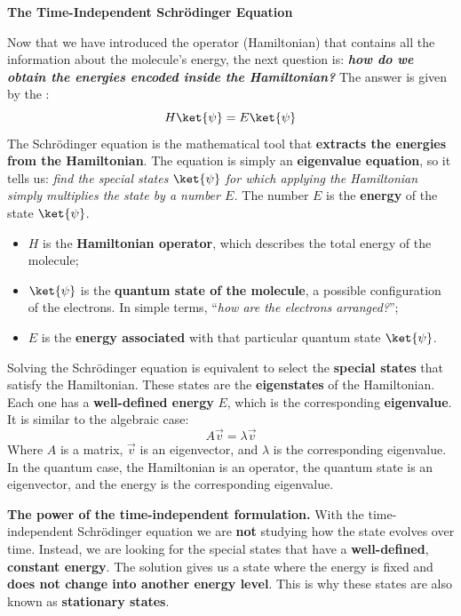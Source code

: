 \highspace
\begin{flushleft}
    \textcolor{Green3}{ \textbf{The Time-Independent Schrödinger Equation}}
\end{flushleft}
Now that we have introduced the operator (Hamiltonian) that contains all the information about the molecule's energy, the next question is: \emph{\textbf{how do we obtain the energies encoded inside the Hamiltonian?}} The answer is given by the :
\begin{equation}\label{eq:time-independent-schrodinger-equation}
    H \ket{\psi} = E \ket{\psi}
\end{equation}
The Schrödinger equation is the mathematical tool that \textbf{extracts the energies from the Hamiltonian}. The equation is simply an \textbf{eigenvalue equation}, so it tells us: \emph{find the special states $\ket{\psi}$ for which applying the Hamiltonian simply multiplies the state by a number $E$.} The number $E$ is the \textbf{energy} of the state $\ket{\psi}$.
\begin{itemize}
    \item $H$ is the \textbf{Hamiltonian operator}, which describes the total energy of the molecule;
    \item $\ket{\psi}$ is the \textbf{quantum state of the molecule}, a possible configuration of the electrons. In simple terms, ``\emph{how are the electrons arranged?}'';
    \item $E$ is the \textbf{energy associated} with that particular quantum state $\ket{\psi}$.
\end{itemize}
Solving the Schrödinger equation is equivalent to select the \textbf{special states} that satisfy the Hamiltonian. These states are the \textbf{eigenstates} of the Hamiltonian. Each one has a \textbf{well-defined energy} $E$, which is the corresponding \textbf{eigenvalue}. It is similar to the algebraic case:
\begin{equation*}
    A \vec{v} = \lambda \vec{v}
\end{equation*}
Where $A$ is a matrix, $\vec{v}$ is an eigenvector, and $\lambda$ is the corresponding eigenvalue. In the quantum case, the Hamiltonian is an operator, the quantum state is an eigenvector, and the energy is the corresponding eigenvalue.

\highspace
\textcolor{Green3}{ \textbf{The power of the time-independent formulation.}} With the time-independent Schrödinger equation we are \textbf{not} studying how the state evolves over time. Instead, we are looking for the special states that have a \textbf{well-defined}, \textbf{constant energy}. The solution gives us a state where the energy is fixed and \textbf{does not change into another energy level}. This is why these states are also known as \textbf{stationary states}.

